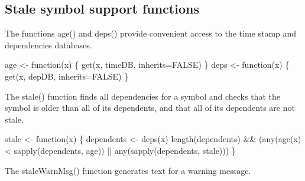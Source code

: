 \documentclass[a4paper]{article}%
\begin{document}
\subsection{Stale symbol support functions}

The functions {\Tt{}age()\nwendquote} and {\Tt{}deps()\nwendquote} provide convenient
access to the time stamp and dependencies databases.

\nwenddocs{}\endmoddef\nwstartdeflinemarkup{}\nwenddeflinemarkup
age <- function(x) \{
    get(x, timeDB, inherits=FALSE)
\}
deps <- function(x) \{
    get(x, depDB, inherits=FALSE)
\}    
\nwendcode{}\nwdocspar

The {\Tt{}stale()\nwendquote} function finds all dependencies for a symbol
and checks that the symbol is older than all of its dependents,
and that all of its dependents are not stale.

\nwenddocs{}\plusendmoddef\nwstartdeflinemarkup{}\nwenddeflinemarkup
stale <- function(x) \{
    dependents <- deps(x)
    length(dependents) &&
        (any(age(x) < sapply(dependents, age)) || 
         any(sapply(dependents, stale)))
\}
\nwendcode{}\nwdocspar

The {\Tt{}staleWarnMsg()\nwendquote} function generates text for a warning message.
\end{document}
